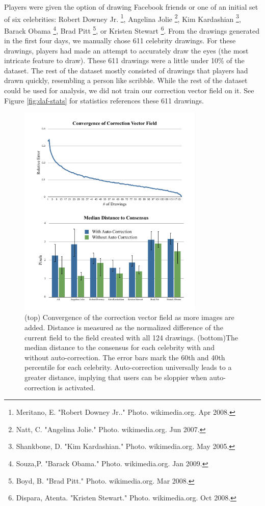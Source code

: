 Players were given the option of drawing Facebook friends or one of an initial set of six celebrities: Robert Downey Jr. \footnote{Meritano, E. "Robert Downey Jr.." Photo. wikimedia.org. Apr 2008.}, Angelina Jolie \footnote{Natt, C. "Angelina Jolie." Photo. wikimedia.org. Jun 2007.}, Kim Kardashian \footnote{Shankbone, D. "Kim Kardashian." Photo. wikimedia.org. May 2005.}, Barack Obama \footnote{Souza,P. "Barack Obama." Photo. wikimedia.org. Jan 2009.}, Brad Pitt \footnote{Boyd, B. "Brad Pitt." Photo. wikimedia.org. Mar 2008.}, or Kristen Stewart \footnote{Dispara, Atenta. "Kristen Stewart." Photo. wikimedia.org. Oct 2008.}. From the drawings generated in the first four days, we manually chose 611 celebrity drawings. For these drawings, players had made an attempt to accurately draw the eyes (the most intricate feature to draw). These 611 drawings were a little under 10\% of the dataset. The rest of the dataset mostly consisted of drawings that players had drawn quickly, resembling a person like scribble. While the rest of the dataset could be used for analysis, we did not train our correction vector field on it.  See Figure \ref{fig:daf-stats}  for statistics references these 611 drawings.

\begin{figure}[!t]
  \centering%
\includegraphics[width=3.5in]{./figures/userstudy/twoGraph.pdf}
  \caption{(top) Convergence of the correction vector field as more images are added. Distance is measured as the normalized difference of the current field to the field created with all 124 drawings. (bottom)The median distance to the consensus for each celebrity with and without auto-correction. The error bars mark the 60th and 40th percentile for each celebrity. Auto-correction universally leads to a greater distance, implying that users can be sloppier when auto-correction is activated.}
  \label{fig:daf-two}
\end{figure}



